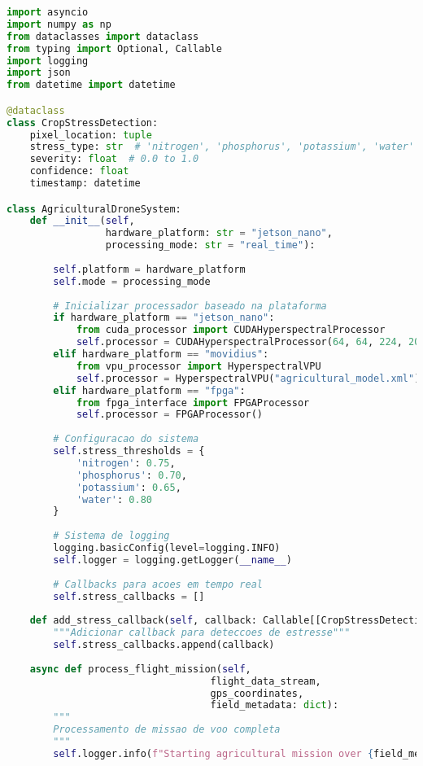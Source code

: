 \begin{lstlisting}[language=Python]
import asyncio
import numpy as np
from dataclasses import dataclass
from typing import Optional, Callable
import logging
import json
from datetime import datetime

@dataclass
class CropStressDetection:
    pixel_location: tuple
    stress_type: str  # 'nitrogen', 'phosphorus', 'potassium', 'water'
    severity: float  # 0.0 to 1.0
    confidence: float
    timestamp: datetime

class AgriculturalDroneSystem:
    def __init__(self, 
                 hardware_platform: str = "jetson_nano",
                 processing_mode: str = "real_time"):
        
        self.platform = hardware_platform
        self.mode = processing_mode
        
        # Inicializar processador baseado na plataforma
        if hardware_platform == "jetson_nano":
            from cuda_processor import CUDAHyperspectralProcessor
            self.processor = CUDAHyperspectralProcessor(64, 64, 224, 20)
        elif hardware_platform == "movidius":
            from vpu_processor import HyperspectralVPU
            self.processor = HyperspectralVPU("agricultural_model.xml")
        elif hardware_platform == "fpga":
            from fpga_interface import FPGAProcessor
            self.processor = FPGAProcessor()
        
        # Configuracao do sistema
        self.stress_thresholds = {
            'nitrogen': 0.75,
            'phosphorus': 0.70,
            'potassium': 0.65,
            'water': 0.80
        }
        
        # Sistema de logging
        logging.basicConfig(level=logging.INFO)
        self.logger = logging.getLogger(__name__)
        
        # Callbacks para acoes em tempo real
        self.stress_callbacks = []
        
    def add_stress_callback(self, callback: Callable[[CropStressDetection], None]):
        """Adicionar callback para deteccoes de estresse"""
        self.stress_callbacks.append(callback)
    
    async def process_flight_mission(self, 
                                   flight_data_stream,
                                   gps_coordinates,
                                   field_metadata: dict):
        """
        Processamento de missao de voo completa
        """
        self.logger.info(f"Starting agricultural mission over {field_metadata['area_hectares']} hectares")
        

\end{lstlisting}
